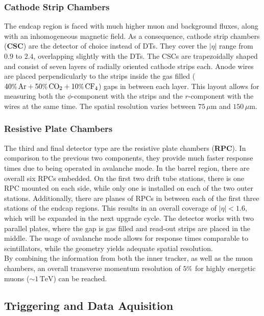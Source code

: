 \subsubsection{Cathode Strip Chambers}

The endcap region is faced with much higher muon and background fluxes, along with an inhomogeneous magnetic field. As a consequence, cathode strip chambers (\textbf{CSC}) are the detector of choice instead of DTs. They cover the $|\eta|$ range from $0.9$ to $2.4$, overlapping slightly with the DTs. The CSCs are trapezoidally shaped and consist of seven layers of radially oriented cathode strips each. Anode wires are placed perpendicularly to the strips inside the gas filled ($40\pct\,\text{Ar} + 50\pct\,\text{CO}_2 + 10\pct\,\text{CF}_4$) gaps in between each layer. This layout allows for measuring both the $\phi$-component with the strips and the $r$-component with the wires at the same time. The spatial resolution varies between $75\,\mu\text{m}$ and $150\,\mu\text{m}$.

\subsubsection{Resistive Plate Chambers}

The third and final detector type are the resistive plate chambers (\textbf{RPC}). In comparison to the previous two components, they provide much faster response times due to being operated in avalanche mode. In the barrel region, there are overall six RPCs embedded. On the first two drift tube stations, there is one RPC mounted on each side, while only one is installed on each of the two outer stations. Additionally, there are planes of RPCs in between each of the first three stations of the endcap regions. This results in an overall coverage of $|\eta| < 1.6$, which will be expanded in the next upgrade cycle. The detector works with two parallel plates, where the gap is gas filled and read-out strips are placed in the middle. The usage of avalanche mode allows for response times comparable to scintillators, while the geometry yields adequate spatial resolution. \\

By combining the information from both the inner tracker, as well as the muon chambers, an overall transverse momentum resolution of $5\pct$ for highly energetic muons ($\sim 1\,\text{TeV}$) can be reached.



\subsection{Triggering and Data Aquisition}

